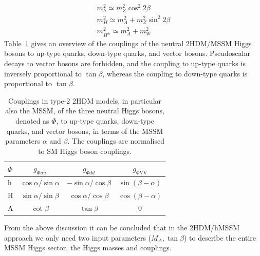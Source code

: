 \begin{equation}\label{equ:alignment_limit}
\begin{split}
m_{h}^{2} \simeq m_{Z}^{2}\cos^{2}2\beta \\
m_{H}^{2} \simeq m_{A}^{2} + m_{Z}^{2}\sin^{2}2\beta \\
m_{H^{\pm}}^{2} \simeq m_{A}^{2} + m_{W}^{2}
\end{split}
\end{equation}
Table~\ref{tab:couplings} gives an overview of the couplings of the neutral 2HDM/MSSM Higgs bosons to up-type quarks, down-type quarks, and vector bosons.
Pseudoscalar decays to vector bosons are forbidden, and the coupling to up-type quarks is inversely proportional to $\tan\beta$, whereas the coupling to down-type quarks is proportional to $\tan\beta$.
\begin{table}[h]
\centering
\begin{tabular}{l c c c}
$\Phi$  & $g_{\Phi \overline{u}u}$ & $g_{\Phi \overline{d}d}$ & $g_{\Phi\mathrm{VV}}$ \\ \hline
h       & $\cos\alpha/\sin\alpha$  & $-\sin\alpha/\cos\beta$  & $\sin(\beta-\alpha)$ \\
H   & $\sin\alpha/\sin\beta$   & $\cos\alpha/\cos\beta$   & $\cos(\beta-\alpha)$ \\
A   & $\cot\beta$              & $\tan\beta$              & 0 \\
\end{tabular}
\caption{Couplings in type-2 2HDM models, in particular also the MSSM, of the three neutral Higgs bosons, denoted as $\Phi$, to up-type quarks, down-type quarks, and vector bosons, in terms of the MSSM parameters $\alpha$ and $\beta$. The couplings are normalised to SM Higgs boson couplings.\label{tab:couplings}}
\end{table}
From the above discussion it can be concluded that in the 2HDM/hMSSM approach we only need two input parameters ($M_{A}, \tan\beta$) to describe the entire MSSM Higgs sector, the Higgs masses and couplings.
